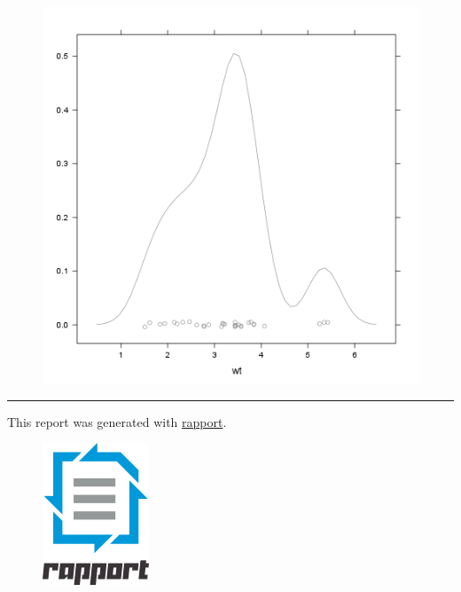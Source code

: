 \documentclass{article}
\makeatletter
\def\maxwidth{\ifdim\Gin@nat@width>\linewidth\linewidth
\else\Gin@nat@width\fi}
\let\Oldincludegraphics\includegraphics
\renewcommand{\includegraphics}[1]{\Oldincludegraphics[width=\maxwidth]{#1}}
\makeatother
\begin{document}
\begin{figure}[htbp]
\centering
\includegraphics{16a7d5cf96ceceffd6db59f9a2514dce.png}
\caption{}
\end{figure}

\begin{center}\rule{3in}{0.4pt}\end{center}

This report was generated with
\href{http://rapport-package.info/}{rapport}.

\begin{figure}[htbp]
\centering
\includegraphics{images/rapport.png}
\caption{}
\end{figure}
\end{document}
